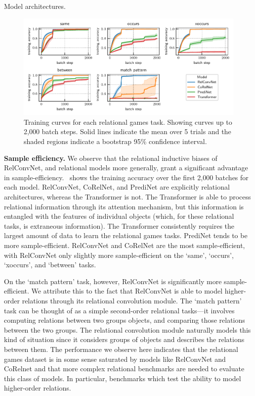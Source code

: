 \begin{table}[ht]
    \centering
    
    \caption{Model architectures.}
    \label{tab:architectures}
\end{table}



\begin{figure}
    \centering
    \includegraphics[width=\textwidth]{figs/experiments/all_training_curves.pdf}
    \caption{Training curves for each relational games task. Showing curves up to 2,000 batch steps. Solid lines indicate the mean over 5 trials and the shaded regions indicate a bootstrap 95\% confidence interval.}\label{fig:training_curves}
\end{figure}

\textbf{Sample efficiency.} We observe that the relational inductive biases of RelConvNet, and relational models more generally, grant a significant advantage in sample-efficiency.~ shows the training accuracy over the first 2,000 batches for each model. RelConvNet, CoRelNet, and PrediNet are explicitly relational architectures, whereas the Transformer is not. The Transformer is able to process relational information through its attention mechanism, but this information is entangled with the features of individual objects (which, for these relational tasks, is extraneous information). The Transformer consistently requires the largest amount of data to learn the relational games tasks. PrediNet tends to be more sample-efficient. RelConvNet and CoRelNet are the most sample-efficient, with RelConvNet only slightly more sample-efficient on the `same', `occurs', `xoccurs', and `between' tasks.

On the `match pattern' task, however, RelConvNet is significantly more sample-efficient. We attribute this to the fact that RelConvNet is able to model higher-order relations through its relational convolution module. The `match pattern' task can be thought of as a simple second-order relational tasks---it involves computing relations between two groups objects, and comparing those relations between the two groups. The relational convolution module naturally models this kind of situation since it considers groups of objects and describes the relations between them. The performance we observe here indicates that the relational games dataset is in some sense saturated by models like RelConvNet and CoRelnet and that more complex relational benchmarks are needed to evaluate this class of models. In particular, benchmarks which test the ability to model higher-order relations.

